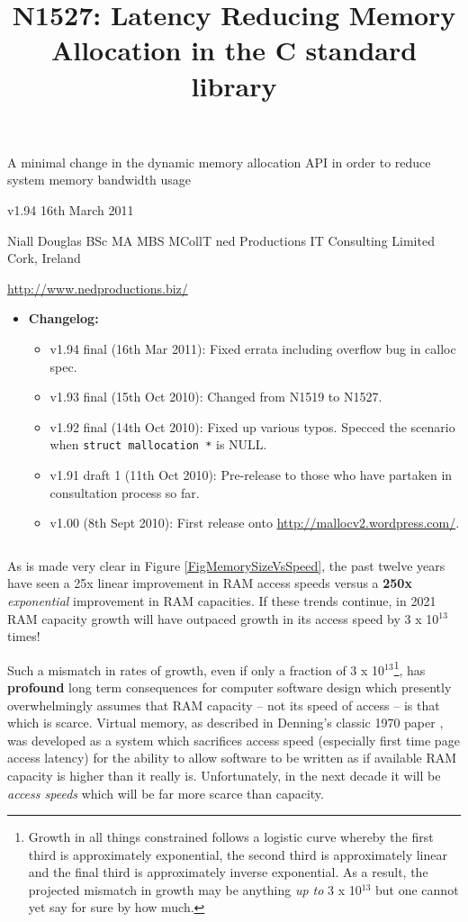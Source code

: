 \documentclass[wd]{isov2}
\newcommand{\superscript}[1]{\ensuremath{^{\textrm{#1}}}}
\begin{document}
\title{N1527: Latency Reducing Memory Allocation in the C standard library}{\linebreak \large{A minimal change in the dynamic memory allocation API in order to reduce system memory bandwidth usage}}{}

v1.94 16th March 2011

Niall Douglas BSc MA MBS MCollT \hfill ned Productions IT Consulting Limited \linebreak
Cork, Ireland \hfill {\url{http://www.nedproductions.biz/}

\small{\begin{itemize}
\item \textbf{Changelog:}
\tiny{\begin{itemize}
\item v1.94 final (16th Mar 2011): Fixed errata including overflow bug in calloc spec.
\item v1.93 final (15th Oct 2010): Changed from N1519 to N1527.
\item v1.92 final (14th Oct 2010): Fixed up various typos. Specced the scenario when \texttt{struct mallocation *} is NULL.
\item v1.91 draft 1 (11th Oct 2010): Pre-release to those who have partaken in consultation process so far.
\item v1.00 (8th Sept 2010): First release onto \url{http://mallocv2.wordpress.com/}.
\end{itemize}}
\end{itemize}}

\begin{verbatim}
\end{verbatim}

\begin{foreword}
As is made very clear in Figure \ref{FigMemorySizeVsSpeed}, the past twelve years have seen a 25x linear improvement in RAM access speeds versus a \textbf{250x} \emph{exponential} improvement in RAM capacities. If these trends continue, in 2021 RAM capacity growth will have outpaced growth in its access speed by 3 x 10\superscript{13} times!

Such a mismatch in rates of growth, even if only a fraction of 3 x 10\superscript{13}\footnote{Growth in all things constrained follows a logistic curve whereby the first third is approximately exponential, the second third is approximately linear and the final third is approximately inverse exponential. As a result, the projected mismatch in growth may be anything \emph{up to} 3 x 10\superscript{13} but one cannot yet say for sure by how much.}, has \textbf{profound} long term consequences for computer software design which presently overwhelmingly assumes that RAM capacity -- not its speed of access -- is that which is scarce. Virtual memory, as described in Denning's classic 1970 paper , was developed as a system which sacrifices access speed (especially first time page access latency) for the ability to allow software to be written as if available RAM capacity is higher than it really is. Unfortunately, in the next decade it will be \emph{access speeds} which will be far more scarce than capacity.


\end{foreword}}
\end{document}
